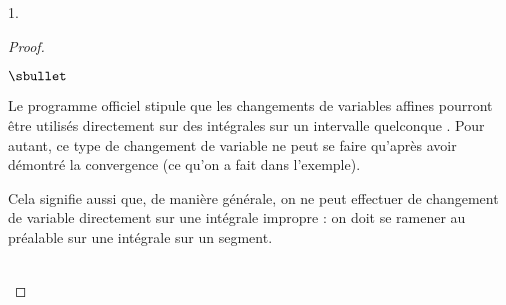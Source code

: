 \documentclass[11pt]{article}%
\begin{document}
\begin{noliste}{1.}
\begin{proof}
\newpage


\begin{remark}%
  \begin{noliste}{$\sbullet$}
  \item Le programme officiel stipule que \og les changements de
    variables affines pourront être utilisés directement sur des
    intégrales sur un intervalle quelconque \fg{}. Pour autant, ce
    type de changement de variable ne peut se faire qu'après avoir
    démontré la convergence (ce qu'on a fait dans l'exemple). 
  \item Cela signifie aussi que, de manière générale, on ne peut
    effectuer de changement de variable directement sur une intégrale
    impropre : on doit se ramener au préalable sur une intégrale sur
    un segment.
  \end{noliste}
\end{remark}~\\[-1.3cm]
\end{proof}

\end{noliste}
\end{document}
